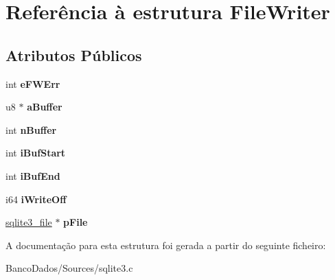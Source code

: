 \hypertarget{struct_file_writer}{\section{Referência à estrutura File\-Writer}
\label{struct_file_writer}
}
\subsection*{Atributos Públicos}
\begin{DoxyCompactItemize}
\item 
\hypertarget{struct_file_writer_a9d6206477bbbd0ce69087c7f9946813d}{int {\bfseries e\-F\-W\-Err}}\label{struct_file_writer_a9d6206477bbbd0ce69087c7f9946813d}

\item 
\hypertarget{struct_file_writer_a0b1f871754a66f029bb91e497dcc7b73}{u8 $\ast$ {\bfseries a\-Buffer}}\label{struct_file_writer_a0b1f871754a66f029bb91e497dcc7b73}

\item 
\hypertarget{struct_file_writer_af2dceb2795ba9edef0158601922448e3}{int {\bfseries n\-Buffer}}\label{struct_file_writer_af2dceb2795ba9edef0158601922448e3}

\item 
\hypertarget{struct_file_writer_a64ce30042d13eeb585998f5648a6a5a8}{int {\bfseries i\-Buf\-Start}}\label{struct_file_writer_a64ce30042d13eeb585998f5648a6a5a8}

\item 
\hypertarget{struct_file_writer_ad38aa3b0a138de0c419f72c0c8994375}{int {\bfseries i\-Buf\-End}}\label{struct_file_writer_ad38aa3b0a138de0c419f72c0c8994375}

\item 
\hypertarget{struct_file_writer_ade3665625c8607582daa7130d7a2683f}{i64 {\bfseries i\-Write\-Off}}\label{struct_file_writer_ade3665625c8607582daa7130d7a2683f}

\item 
\hypertarget{struct_file_writer_a24a75f5d5d088a809c1e811154912e33}{\hyperlink{structsqlite3__file}{sqlite3\-\_\-file} $\ast$ {\bfseries p\-File}}\label{struct_file_writer_a24a75f5d5d088a809c1e811154912e33}

\end{DoxyCompactItemize}


A documentação para esta estrutura foi gerada a partir do seguinte ficheiro\-:\begin{DoxyCompactItemize}
\item 
Banco\-Dados/\-Sources/sqlite3.\-c\end{DoxyCompactItemize}
